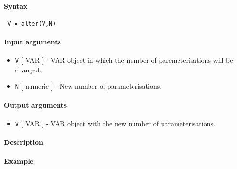 


	\paragraph{Syntax}
 
 \begin{verbatim}
 V = alter(V,N)
 \end{verbatim}
 
 \paragraph{Input arguments}
 
 \begin{itemize}
 \item
   \texttt{V} {[} VAR {]} - VAR object in which the number of
   paremeterisations will be changed.
 \item
   \texttt{N} {[} numeric {]} - New number of parameterisations.
 \end{itemize}
 
 \paragraph{Output arguments}
 
 \begin{itemize}
 \item
   \texttt{V} {[} VAR {]} - VAR object with the new number of
   parameterisations.
 \end{itemize}
 
 \paragraph{Description}
 
 \paragraph{Example}


